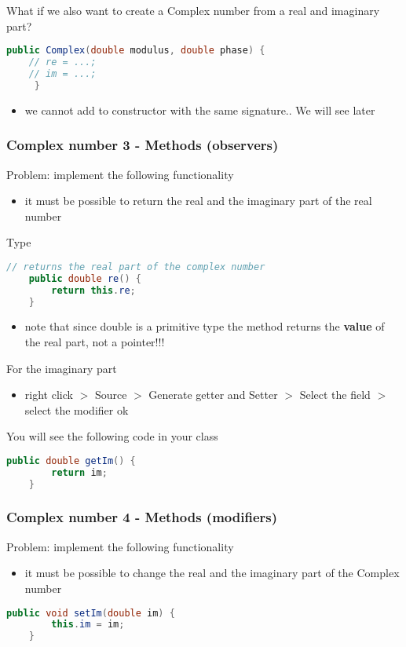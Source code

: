 \documentclass{article}
\begin{document}
What if we also want to create a Complex number from a real and imaginary part? 
\begin{lstlisting}[language=Java,escapechar=|]
	public Complex(double modulus, double phase) {
	// re = ...;
	// im = ...;
     }
\end{lstlisting}
\begin{itemize}
\item we cannot add to constructor with the same signature.. We will see later 
\end{itemize}


\subsubsection{Complex number 3 - Methods (observers)}
Problem: implement the following functionality
\begin{itemize}
\item it must be possible to return the real and the imaginary part of the real number
\end{itemize}
Type
\begin{lstlisting}[language=Java,escapechar=|]
	// returns the real part of the complex number
	public double re() {
		return this.re;
	}
\end{lstlisting}
\begin{itemize}
\item note that since double is a primitive type the method returns the \textbf{value} of the real part, not a pointer!!!
\end{itemize}

For the imaginary part 
\begin{itemize}
\item right click $>$ Source $>$ Generate getter and Setter $>$ Select the field $>$ select the modifier ok
\end{itemize}
You will see the following code in your class
\begin{lstlisting}[language=Java,escapechar=|]
	public double getIm() {
		return im;
	}
\end{lstlisting}

\subsubsection{Complex number 4 - Methods (modifiers)}
Problem: implement the following functionality
\begin{itemize}
\item it must be possible to change the real and the imaginary part of the Complex number
\end{itemize}
\begin{lstlisting}[language=Java,escapechar=|]
	public void setIm(double im) {
		this.im = im;
	}
\end{lstlisting}
\end{document}
